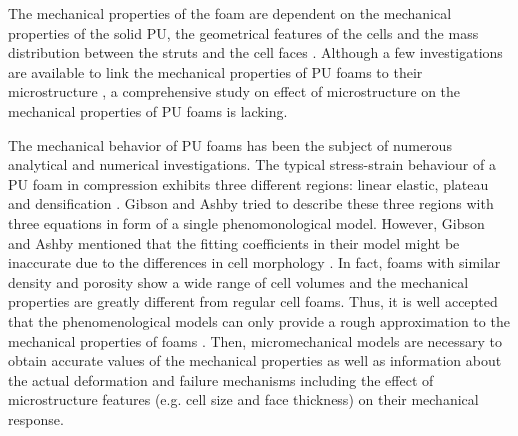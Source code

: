 \documentclass[review]{elsarticle}
\begin{document}
The mechanical properties of the foam are dependent on the mechanical properties of the solid PU, the geometrical features of the cells and the mass distribution between the struts and the cell faces  \citep{Berlin1980}. Although a few investigations are available to link the mechanical properties of PU foams to their microstructure ,  a comprehensive study on effect of microstructure on the mechanical properties of PU foams is lacking\cite{Chen2015150,Jang20102872}.

The mechanical behavior of PU foams has been the subject of numerous analytical and numerical investigations. The typical stress-strain behaviour of a PU foam in compression exhibits three different regions: linear elastic, plateau and densification \citep{Avalle2001455}. Gibson and Ashby tried to describe these three regions with three equations in form of a single phenomonological model. However, Gibson and Ashby mentioned that the fitting coefficients in their model might be inaccurate due to the differences in cell morphology \citep{GibsonBookCellular}. In fact, foams with similar density and porosity show a wide range of cell volumes and the mechanical properties are greatly different from regular cell foams. Thus, it is well accepted that the phenomenological models can only provide a rough approximation to the mechanical properties of foams \citep{Ma2011}. Then, micromechanical models are necessary to obtain accurate values of the mechanical properties as well as information about the actual deformation and failure mechanisms including the effect of microstructure features (e.g. cell size and face thickness) on their mechanical response.
\end{document}
